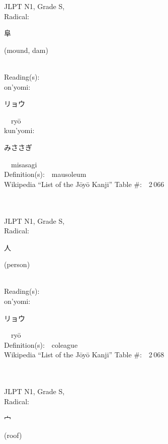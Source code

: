 \begin{multicols}{2}
{JLPT N1, Grade S, \\Radical:\ \ {\begin{CJK}{UTF8}{min} 阜 \end{CJK}} (mound, dam) } \\
Reading(s):\ \ \\
{\hspace*{1em}}on'yomi:\ \ \\
{\hspace*{2em}}{\begin{CJK}{UTF8}{min} リョウ \end{CJK}}\ \ ry\=o\ \ \\
{\hspace*{1em}}kun'yomi:\ \ \\
{\hspace*{2em}}{\begin{CJK}{UTF8}{min} みささぎ \end{CJK}}\ \ misasagi\ \ \\
Definition(s):\ \ mausoleum \\
Wikipedia ``List of the J\=oy\=o Kanji'' Table \#:\ \ 2\,066 \\
\ \ \\
{\fontsize{34pt}{40pt}  }\ \ \\
{JLPT N1, Grade S, \\Radical:\ \ {\begin{CJK}{UTF8}{min} 人 \end{CJK}} (person) } \\
Reading(s):\ \ \\
{\hspace*{1em}}on'yomi:\ \ \\
{\hspace*{2em}}{\begin{CJK}{UTF8}{min} リョウ \end{CJK}}\ \ ry\=o\ \ \\
Definition(s):\ \ coleague \\
Wikipedia ``List of the J\=oy\=o Kanji'' Table \#:\ \ 2\,068 \\
\ \ \\
{\fontsize{34pt}{40pt}  }\ \ \\
{JLPT N1, Grade S, \\Radical:\ \ {\begin{CJK}{UTF8}{min} 宀 \end{CJK}} (roof) } \\

\end{multicols}
